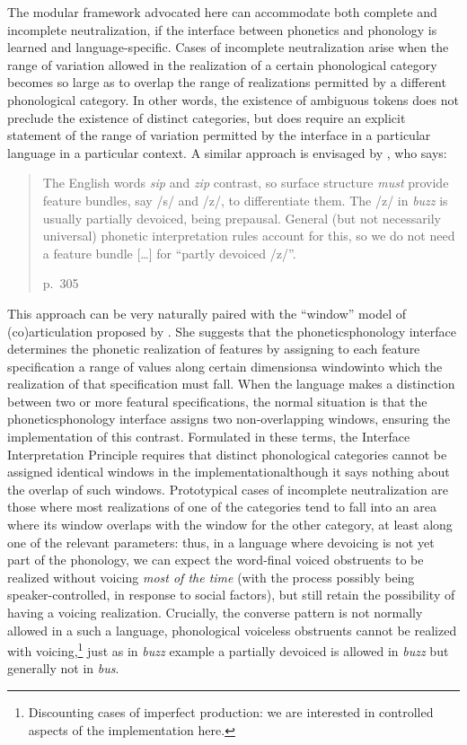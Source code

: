 The modular framework advocated here can accommodate both complete and incomplete neutralization, if the interface between phonetics and phonology is learned and language\hyp specific. Cases of incomplete neutralization arise when the range of variation allowed in the realization of a certain phonological category becomes so large as to overlap the range of realizations permitted by a different phonological category. In other words, the existence of ambiguous tokens does not preclude the existence of distinct categories, but does require an explicit statement of the range of variation permitted by the interface in a particular language in a particular context. A similar approach is envisaged by \citet{scobbie95:_what}, who says: \blockquote[p.~305]{The English words \emph{sip} and \emph{zip} contrast, so surface structure \emph{must} provide feature bundles, say /s/ and /z/, to differentiate them. The /z/ in \emph{buzz} is usually partially devoiced, being prepausal. General (but not necessarily universal) phonetic interpretation rules account for this, so we do not need a feature bundle [\ldots] for \enquote{partly devoiced /z/}.}

This approach can be very naturally paired with the \enquote{window} model of (co)articulation proposed by \citet{keating88,keating90}. She suggests that the phonetics\endash phonology interface determines the phonetic realization of features by assigning to each feature specification a range of values along certain dimensions\dash a window\dash into which the realization of that specification must fall. When the language makes a distinction between two or more featural specifications, the normal situation is that the phonetics\endash phonology interface assigns two non\hyp overlapping windows, ensuring the implementation of this contrast. Formulated in these terms, the Interface Interpretation Principle requires that distinct phonological categories cannot be assigned identical windows in the implementation\dash although it says nothing about the overlap of such windows. Prototypical cases of incomplete neutralization are those where most realizations of one of the categories tend to fall into an area where its window overlaps with the window for the other category, at least along one of the relevant parameters: thus, in a language where devoicing is not yet part of the phonology, we can expect the word\hyp final voiced obstruents to be realized without voicing \emph{most of the time} (with the process possibly being speaker\hyp controlled, \eg in response to social factors), but still retain the possibility of having a voicing realization. Crucially, the converse pattern is not normally allowed in a such a language, \ie phonological voiceless obstruents cannot be realized with voicing,\footnote{Discounting cases of imperfect production: we are interested in controlled aspects of the implementation here.} just as in  \emph{buzz} example a partially devoiced \ipa{[z]} is allowed in \emph{buzz} but generally not in \emph{bus}.

